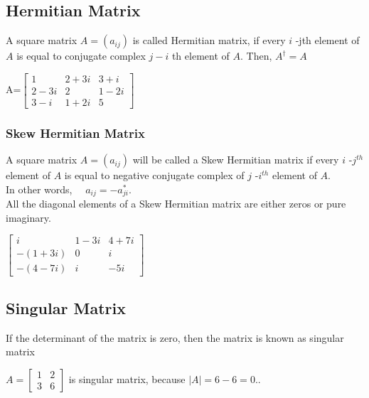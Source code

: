 \subsection{Hermitian Matrix}
A square matrix $A=\left(a_{i j}\right)$ is called Hermitian matrix, if every $i$ -jth element of $A$ is equal to conjugate complex $j-i$ th element of $A$. Then, $A^{\dagger}=A$
\begin{example}
	$\text{A=}\left[\begin{array}{lll}
			1 & 2+3 i & 3+i \\
			2-3 i & 2 & 1-2 i \\
			3-i & 1+2 i & 5
	\end{array}\right]$
\end{example}
\subsubsection{Skew Hermitian Matrix}
 A square matrix $A=\left(a_{i j}\right)$ will be called a Skew Hermitian matrix if every $i$ -$j^{th}$ element of $A$ is equal to negative conjugate complex of $j$ -$i^{th}$ element of $A$.
\\In other words, $\quad a_{i j}=-{a}_{j i}^{\ast}$.\\All the diagonal elements of a Skew Hermitian matrix are either zeros or pure imaginary.
\begin{example}
	$\left[\begin{array}{ccc}i & 1-3 i & 4+7 i \\ -(1+3 i) & 0 &  i \\ -(4-7i) &  i & -5 i\end{array}\right]$
\end{example}
\subsection{Singular Matrix} If the determinant of the matrix is zero, then the matrix is known as singular matrix \begin{example}
	 $A=\left[\begin{array}{ll}1 & 2 \\ 3 & 6\end{array}\right]$ is singular matrix, because $|A|=6-6=0$..
\end{example}

